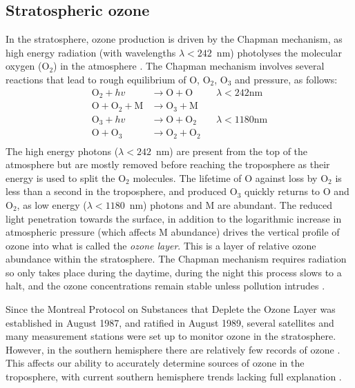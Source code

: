   \subsection{Stratospheric ozone}
  
    In the stratosphere, ozone production is driven by the Chapman mechanism, as high energy radiation (with wavelengths $\lambda<242$~nm) photolyses the molecular oxygen (O$_2$) in the atmosphere \parencite[][Chapter 3, section 2]{BrasseurJacob2017}.
    The Chapman mechanism involves several reactions that lead to rough equilibrium of O, O$_2$, O$_3$ and pressure, as follows:
    \begin{equation}
      \begin{aligned}
        \text{O}_2 + hv              & \to \text{O}+\text{O}     && \lambda < 242 \text{nm} \\
        \text{O}+\text{O}_2+\text{M} & \to \text{O}_3+\text{M}   &&    \\
        \text{O}_3 + hv              & \to \text{O}+\text{O}_2   && \lambda < 1180 \text{nm} \\
        \text{O} + \text{O}_3        & \to \text{O}_2+\text{O}_2 &&       \\
      \end{aligned}
      \label{LR:O3:eqn_Chapman}
    \end{equation}
    The high energy photons ($\lambda < 242$~nm) are present from the top of the atmosphere but are mostly removed before reaching the troposphere as their energy is used to split the O$_2$ molecules.
    The lifetime of O against loss by O$_2$ is less than a second in the troposphere, and produced O$_3$ quickly returns to O and O$_2$, as low energy ($\lambda < 1180$~nm) photons and M are abundant.
    The reduced light penetration towards the surface, in addition to the logarithmic increase in atmospheric pressure (which affects M abundance) drives the vertical profile of ozone into what is called the \textit{ozone layer}.
    This is a layer of relative ozone abundance within the stratosphere.
    The Chapman mechanism requires radiation so only takes place during the daytime, during the night this process slows to a halt, and the ozone concentrations remain stable unless pollution intrudes \parencite[Chapter 10]{Jacob_1999_book}.
  
    
    Since the Montreal Protocol on Substances that Deplete the Ozone Layer was established in August 1987, and ratified in August 1989, several satellites and many measurement stations were set up to monitor ozone in the stratosphere.
    However, in the southern hemisphere there are relatively few records of ozone \parencite{Huang2018}.
    This affects our ability to accurately determine sources of ozone in the troposphere, with current southern hemisphere trends lacking full explanation \parencite{Zeng2017}. 
  
